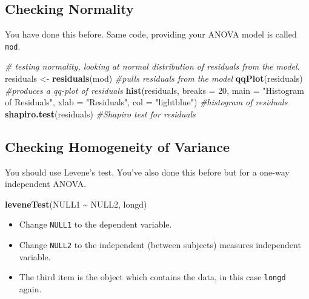 \documentclass[
]{book}
\newenvironment{Shaded}{\begin{snugshade}}{\end{snugshade}}
\newcommand{\AttributeTok}[1]{\textcolor[rgb]{0.13,0.29,0.53}{#1}}
\newcommand{\CommentTok}[1]{\textcolor[rgb]{0.56,0.35,0.01}{\textit{#1}}}
\newcommand{\DecValTok}[1]{\textcolor[rgb]{0.00,0.00,0.81}{#1}}
\newcommand{\FunctionTok}[1]{\textcolor[rgb]{0.13,0.29,0.53}{\textbf{#1}}}
\newcommand{\NormalTok}[1]{#1}
\newcommand{\OtherTok}[1]{\textcolor[rgb]{0.56,0.35,0.01}{#1}}
\newcommand{\SpecialCharTok}[1]{\textcolor[rgb]{0.81,0.36,0.00}{\textbf{#1}}}
\newcommand{\StringTok}[1]{\textcolor[rgb]{0.31,0.60,0.02}{#1}}
\providecommand{\tightlist}{%
  \setlength{\itemsep}{0pt}\setlength{\parskip}{0pt}}
\let\oldsubsection\subsection
\renewcommand{\subsection}{\needspace{3\baselineskip}\oldsubsection}  %
\begin{document}
\subsection{Checking Normality}\label{checking-normality}

You have done this before. Same code, providing your ANOVA model is called \texttt{mod}.

\begin{Shaded}
\begin{Highlighting}[]
\CommentTok{\# testing normality, looking at normal distribution of residuals from the model.}
\NormalTok{residuals }\OtherTok{\textless{}{-}} \FunctionTok{residuals}\NormalTok{(mod) }\CommentTok{\#pulls residuals from the model}
\FunctionTok{qqPlot}\NormalTok{(residuals) }\CommentTok{\#produces a qq{-}plot of residuals}
\FunctionTok{hist}\NormalTok{(residuals, }\AttributeTok{breaks =} \DecValTok{20}\NormalTok{, }\AttributeTok{main =} \StringTok{"Histogram of Residuals"}\NormalTok{, }\AttributeTok{xlab =} \StringTok{"Residuals"}\NormalTok{, }\AttributeTok{col =} \StringTok{"lightblue"}\NormalTok{) }\CommentTok{\#histogram of residuals}
\FunctionTok{shapiro.test}\NormalTok{(residuals) }\CommentTok{\#Shapiro test for residuals}
\end{Highlighting}
\end{Shaded}

\subsection{Checking Homogeneity of Variance}\label{checking-homogeneity-of-variance}

You should use Levene's test. You've also done this before but for a one-way independent ANOVA.

\begin{Shaded}
\begin{Highlighting}[]
\FunctionTok{leveneTest}\NormalTok{(NULL1 }\SpecialCharTok{\textasciitilde{}}\NormalTok{ NULL2, longd)}
\end{Highlighting}
\end{Shaded}

\begin{itemize}
\tightlist
\item
  Change \texttt{NULL1} to the dependent variable.
\item
  Change \texttt{NULL2} to the independent (between subjects) measures independent variable.
\item
  The third item is the object which contains the data, in this case \texttt{longd} again.
\end{itemize}
\end{document}
